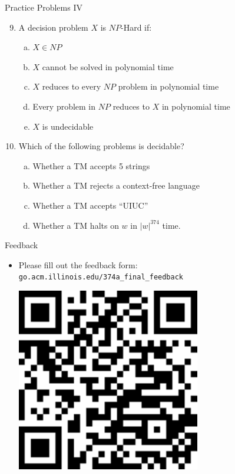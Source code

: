 \documentclass{beamer}
\begin{document}
\begin{frame}[t]{Practice Problems IV}
    \begin{enumerate}
        \setcounter{enumi}{8}
        \item A decision problem $X$ is $NP$-Hard if:
            \begin{enumerate}[(a)]
                \item $X \in NP$
                \item $X$ cannot be solved in polynomial time
                \item $X$ reduces to every $NP$ problem in polynomial time
                \item Every problem in $NP$ reduces to $X$ in polynomial time %
                \item $X$ is undecidable
            \end{enumerate}
        \item Which of the following problems is decidable?
        \begin{enumerate}[(a)]
            \item Whether a TM accepts 5 strings
            \item Whether a TM rejects a context-free language
            \item Whether a TM accepts ``UIUC''
            \item Whether a TM halts on $w$ in $|w|^{374}$ time.
        \end{enumerate}
    \end{enumerate}
\end{frame}

\begin{frame}[t]{Feedback}
    \begin{itemize}
        \item Please fill out the feedback form: \texttt{go.acm.illinois.edu/374a\_final\_feedback}\vspace{.05\textwidth}\begin{center}
            \includegraphics[height=.5\textwidth]{feedback.pdf}
        \end{center}
    \end{itemize}
\end{frame}
\end{document}
